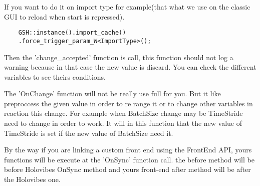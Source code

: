 If you want to do it on import type for example(that what we use on the classic GUI to reload when start is repressed).


\begin{lstlisting}
    GSH::instance().import_cache()
    .force_trigger_param_W<ImportType>();
\end{lstlisting}

Then the 'change\_accepted' function is call, this function should not log a warning because in that case the new value is discard. You can check the different variables to see theirs conditions.

The 'OnChange' function will not be really use full for you. But it like preproccess the given value in order to re range it or to change other variables in reaction this change. For example when BatchSize change may be TimeStride need to change in order to work. It will in this function that the new value of TimeStride is set if the new value of BatchSize need it. 

By the way if you are linking a custom front end using the FrontEnd API, yours functions will be execute at the 'OnSync' function call. the before method will be before Holovibes OnSync method and yours front-end after method will be after the Holovibes one.
